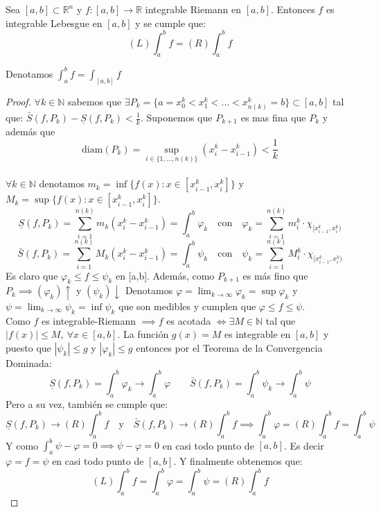 \begin{teorema}
    Sea $[a, b] \subset \mathbb{R}^n$ y $ f:[a,b] \to \mathbb{R}$ integrable Riemann en $[a, b]$. Entonces $f$ es integrable Lebesgue en $[a, b]$ y se cumple que:
    $$ (L) \int_{a}^{b}f = (R) \int_{a}^{b}f $$
\end{teorema}
\begin{observación}
Denotamos $\int_{a}^{b}f = \int_{[a, b]}f$
\end{observación}
\begin{proof}
    $\forall k \in \mathbb{N}$ sabemos que $\exists P_k = \{ a = x_0^k < x_1^k < \dots < x_{n(k)}^k = b \} \subset [a,b]$ tal que: $\bar{S}(f, P_k) - \underline{S}(f, P_k) < \frac{1}{k}$.
    Suponemos que $P_{k+1}$ es mas fina que $P_{k}$ y además que $$\text{diam}(P_k) = \sup_{i \in \{1, \dots, n(k)\}}(x_i^k - x_{i-1}^k) < \frac{1}{k}$$
    \\$\forall k \in \mathbb{N}$ denotamos $m_k = \inf\{f(x) : x \in [x_{i-1}^k, x_i^k]\}$ y $M_k = \sup\{f(x) : x \in [x_{i-1}^k, x_i^k]\}$.
        $$ \underline{S}(f, P_k) = \sum_{i=1}^{n(k)}m_k(x_i^k - x_{i-1}^k) = \int_{a}^{b}\varphi_k \quad \text{con} \quad \varphi_k = \sum_{i = 1}^{n(k)}m_i^k\cdot\chi_{[x_{i-1}^k, x_i^k)}$$
        $$\bar{S}(f, P_k) = \sum_{i=1}^{n(k)}M_k(x_i^k - x_{i-1}^k) = \int_{a}^{b} \psi_k \quad \text{con}  \quad \psi_k  = \sum_{i = 1}^{n(k)}M_i^k\cdot\chi_{[x_{i-1}^k, x_i^k)}$$
        Es claro que $\varphi_k  \leq f \leq \psi_k$ en [a,b].
        Además, como $P_{k+1}$ es más fino que $P_k \implies (\varphi_{k})\uparrow$ y $(\psi_k)\downarrow$
        Denotamos $\varphi = \lim_{k \to \infty}\varphi_k = \sup\varphi_k$
        y $\psi  = \lim_{k \to \infty}\psi_k = \inf\psi_k$ que son medibles y cumplen que $\varphi \leq f \leq \psi$.\\
        Como $f$ es integrable-Riemann $\implies f$ es acotada $\iff \exists M \in \mathbb{N}$ tal que $|f(x)| \leq M, \ \forall x \in [a, b]$.
        La función  $ g(x) = M $ es integrable en $[a, b]$ y puesto que $|\psi_k| \leq g$ y $|\varphi_k| \leq g$ entonces por el Teorema de la Convergencia Dominada: $$\underline{S}(f, P_{k}) = \int_{a}^{b}{\varphi_k} \to \int_{a}^{b}\varphi \qquad \bar{S}(f, P_{k}) = \int_a^b\psi_k \to \int_a^b\psi$$
        Pero a su vez, también se cumple que: \\ $$\underline{S}(f, P_k) \to (R)\int_a^b f \quad \text{y} \quad \bar{S}(f, P_k) \to (R)\int_{a}^{b} f \implies \int_{a}^{b} \varphi = (R)\int_{a}^{b} f = \int_{a}^{b} \psi$$
        Y como $\int_{a}^{b} \psi - \varphi = 0 \implies \psi - \varphi = 0$ en casi todo punto de $[a, b]$. Es decir $\varphi = f = \psi$ en casi todo punto de $[a, b]$. Y finalmente obtenemos que:
    $$(L)\int_{a}^{b}f = \int_{a}^{b}\varphi = \int_a^b\psi = (R)\int_{a}^{b}f$$
\end{proof}

